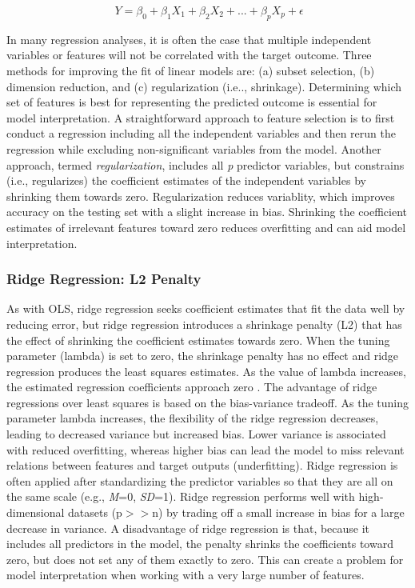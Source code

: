 \documentclass[sigconf]{acmart}
\begin{document}
\begin{equation}
  \ Y = \beta_0 + \beta_1X_1 + \beta_2X_2 +... + \beta_pX_p + \epsilon
\end{equation}


In many regression analyses, it is often the case that multiple independent 
variables or features will not be correlated with the target outcome. Three 
methods for improving the fit of linear models are: (a) subset selection, 
(b) dimension reduction, and (c) regularization (i.e.., shrinkage). Determining 
which set of features is best for representing the predicted outcome is 
essential for model interpretation. A straightforward approach to feature 
selection is to first conduct a regression including all the independent 
variables and then rerun the regression while excluding non-significant 
variables from the model. Another approach, termed \textit{regularization}, 
includes all \textit{p} predictor variables, but constrains (i.e., regularizes) 
the coefficient estimates of the independent variables by shrinking them 
towards zero. Regularization reduces variablity, which improves accuracy 
on the testing set with a slight increase in bias. Shrinking the coefficient 
estimates of irrelevant features toward zero reduces overfitting and can
aid model interpretation. 


\subsubsection{Ridge Regression: L2 Penalty} 

As with OLS, ridge regression seeks coefficient estimates that fit the data 
well by reducing error, but ridge regression introduces a shrinkage penalty
(L2) that has the effect of shrinking the coefficient estimates towards zero. 
When the tuning parameter (lambda) is set to zero, the shrinkage penalty has 
no effect and ridge regression produces the least squares estimates. As the 
value of lambda increases, the estimated regression coefficients approach zero 
\cite{jamesetal13}. The advantage of ridge regressions over least squares is 
based on the bias-variance tradeoff. As the tuning parameter lambda increases, 
the flexibility of the ridge regression decreases, leading to decreased variance 
but increased bias. Lower variance is associated with reduced overfitting, 
whereas higher bias can lead the model to miss relevant relations between
features and target outputs (underfitting). Ridge regression is often applied 
after standardizing the predictor variables so that they are all on the same 
scale (e.g., \textit{M}=0, \textit{SD}=1). Ridge regression performs well with
high-dimensional datasets (p$>>$n) by trading off a small increase in bias for a 
large decrease in variance. A disadvantage of ridge regression is that, because 
it includes all predictors in the model, the penalty shrinks the coefficients 
toward zero, but does not set any of them exactly to zero. This can create a 
problem for model interpretation when working with a very large number of features. 
\end{document}
